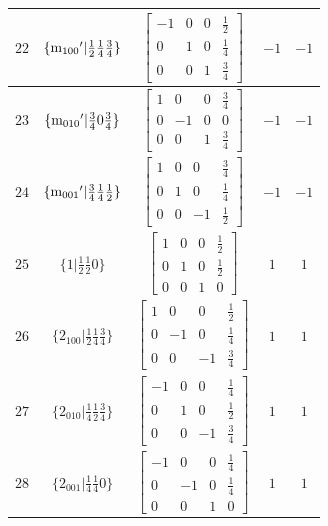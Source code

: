 \documentclass[fleqn,8pt]{jsarticle}
\begin{document}
\begin{longtable}{ccccc}
$ 22 $ & $ \{{\rm m}_{100}{}'|\frac{1}{2} \frac{1}{4} \frac{3}{4}\} $ & $ \begin{bmatrix} -1 & 0 & 0 & \frac{1}{2} \\ 0 & 1 & 0 & \frac{1}{4} \\ 0 & 0 & 1 & \frac{3}{4} \end{bmatrix} $ & $ -1 $ & $ -1 $ \\ \hline
$ 23 $ & $ \{{\rm m}_{010}{}'|\frac{3}{4} 0 \frac{3}{4}\} $ & $ \begin{bmatrix} 1 & 0 & 0 & \frac{3}{4} \\ 0 & -1 & 0 & 0 \\ 0 & 0 & 1 & \frac{3}{4} \end{bmatrix} $ & $ -1 $ & $ -1 $ \\ \hline
$ 24 $ & $ \{{\rm m}_{001}{}'|\frac{3}{4} \frac{1}{4} \frac{1}{2}\} $ & $ \begin{bmatrix} 1 & 0 & 0 & \frac{3}{4} \\ 0 & 1 & 0 & \frac{1}{4} \\ 0 & 0 & -1 & \frac{1}{2} \end{bmatrix} $ & $ -1 $ & $ -1 $ \\ \hline
$ 25 $ & $ \{1|\frac{1}{2} \frac{1}{2} 0\} $ & $ \begin{bmatrix} 1 & 0 & 0 & \frac{1}{2} \\ 0 & 1 & 0 & \frac{1}{2} \\ 0 & 0 & 1 & 0 \end{bmatrix} $ & $ 1 $ & $ 1 $ \\ \hline
$ 26 $ & $ \{2{}_{100}|\frac{1}{2} \frac{1}{4} \frac{3}{4}\} $ & $ \begin{bmatrix} 1 & 0 & 0 & \frac{1}{2} \\ 0 & -1 & 0 & \frac{1}{4} \\ 0 & 0 & -1 & \frac{3}{4} \end{bmatrix} $ & $ 1 $ & $ 1 $ \\ \hline
$ 27 $ & $ \{2{}_{010}|\frac{1}{4} \frac{1}{2} \frac{3}{4}\} $ & $ \begin{bmatrix} -1 & 0 & 0 & \frac{1}{4} \\ 0 & 1 & 0 & \frac{1}{2} \\ 0 & 0 & -1 & \frac{3}{4} \end{bmatrix} $ & $ 1 $ & $ 1 $ \\ \hline
$ 28 $ & $ \{2{}_{001}|\frac{1}{4} \frac{1}{4} 0\} $ & $ \begin{bmatrix} -1 & 0 & 0 & \frac{1}{4} \\ 0 & -1 & 0 & \frac{1}{4} \\ 0 & 0 & 1 & 0 \end{bmatrix} $ & $ 1 $ & $ 1 $ \\ \hline

\end{longtable}
\end{document}

